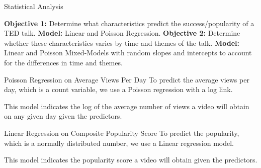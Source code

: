 \begin{frame}{Statistical Analysis}
\begin{outline}
    \1 \textbf{Objective 1:} Determine what characteristics predict the success/popularity of a TED talk. 
        \2 \textbf{Model:} Linear and Poisson Regression. 
    \1 \textbf{Objective 2:} Determine whether these characteristics varies by time and themes of the talk.
        \2 \textbf{Model:} Linear and Poisson Mixed-Models with random slopes and intercepts to account for the differences in time and themes.
\end{outline}
\end{frame}

\begin{frame}{Poisson Regression on Average Views Per Day}
To predict the average views per day, which is a count variable, we use a Poisson regression with a log link. 

This model indicates the log of the average number of views a video will obtain on any given day given the predictors.
\end{frame}



\begin{frame}{Linear Regression on Composite Popularity Score}
To predict the popularity, which is a normally distributed number, we use a Linear regression model.

This model indicates the popularity score a video will obtain given the predictors.
\end{frame}

